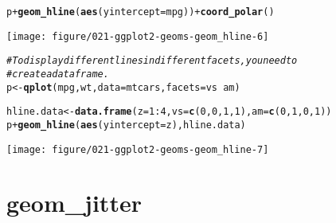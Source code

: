 \documentclass[a4paper,titlepage]{tufte-handout}\usepackage[]{graphicx}\usepackage[]{color}
\makeatletter
\def\maxwidth{ %
  \ifdim\Gin@nat@width>\linewidth
    \linewidth
  \else
    \Gin@nat@width
  \fi
}
\newcommand{\hlnum}[1]{\textcolor[rgb]{0.686,0.059,0.569}{#1}}%
\newcommand{\hlcom}[1]{\textcolor[rgb]{0.678,0.584,0.686}{\textit{#1}}}%
\newcommand{\hlopt}[1]{\textcolor[rgb]{0,0,0}{#1}}%
\newcommand{\hlstd}[1]{\textcolor[rgb]{0.345,0.345,0.345}{#1}}%
\newcommand{\hlkwb}[1]{\textcolor[rgb]{0.69,0.353,0.396}{#1}}%
\newcommand{\hlkwc}[1]{\textcolor[rgb]{0.333,0.667,0.333}{#1}}%
\newcommand{\hlkwd}[1]{\textcolor[rgb]{0.737,0.353,0.396}{\textbf{#1}}}%
\newenvironment{kframe}{%
 \def\at@end@of@kframe{}%
 \ifinner\ifhmode%
  \def\at@end@of@kframe{\end{minipage}}%
  \begin{minipage}{\columnwidth}%
 \fi\fi%
 \def\FrameCommand##1{\hskip\@totalleftmargin \hskip-\fboxsep
 \colorbox{shadecolor}{##1}\hskip-\fboxsep
     \hskip-\linewidth \hskip-\@totalleftmargin \hskip\columnwidth}%
 \MakeFramed {\advance\hsize-\width
   \@totalleftmargin\z@ \linewidth\hsize
   \@setminipage}}%
 {\par\unskip\endMakeFramed%
 \at@end@of@kframe}
\newenvironment{knitrout}{}{} %
\makeatother
\begin{document}
\begin{knitrout}
\begin{kframe}\begin{alltt}
\hlstd{p} \hlopt{+} \hlkwd{geom_hline}\hlstd{(}\hlkwd{aes}\hlstd{(}\hlkwc{yintercept}\hlstd{=mpg))} \hlopt{+} \hlkwd{coord_polar}\hlstd{()}
\end{alltt}
\end{kframe}
\texttt{[image: figure/021-ggplot2-geoms-geom\_hline-6]} 
\begin{kframe}\begin{alltt}
\hlcom{# To display different lines in different facets, you need to}
\hlcom{# create a data frame.}
\hlstd{p} \hlkwb{<-} \hlkwd{qplot}\hlstd{(mpg, wt,} \hlkwc{data}\hlstd{=mtcars,} \hlkwc{facets} \hlstd{= vs} \hlopt{~} \hlstd{am)}

\hlstd{hline.data} \hlkwb{<-} \hlkwd{data.frame}\hlstd{(}\hlkwc{z} \hlstd{=} \hlnum{1}\hlopt{:}\hlnum{4}\hlstd{,} \hlkwc{vs} \hlstd{=} \hlkwd{c}\hlstd{(}\hlnum{0}\hlstd{,}\hlnum{0}\hlstd{,}\hlnum{1}\hlstd{,}\hlnum{1}\hlstd{),} \hlkwc{am} \hlstd{=} \hlkwd{c}\hlstd{(}\hlnum{0}\hlstd{,}\hlnum{1}\hlstd{,}\hlnum{0}\hlstd{,}\hlnum{1}\hlstd{))}
\hlstd{p} \hlopt{+} \hlkwd{geom_hline}\hlstd{(}\hlkwd{aes}\hlstd{(}\hlkwc{yintercept} \hlstd{= z), hline.data)}
\end{alltt}
\end{kframe}
\texttt{[image: figure/021-ggplot2-geoms-geom\_hline-7]} 

\end{knitrout}


\section{geom\_jitter}
\end{document}
